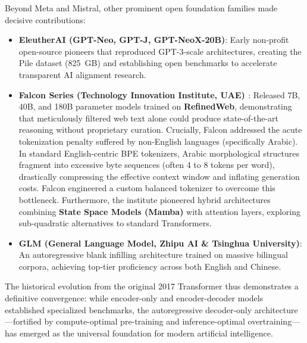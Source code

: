 \documentclass[../../main.tex]{subfiles}
\begin{document}
Beyond Meta and Mistral, other prominent open foundation families made decisive contributions:
\begin{itemize}
    \item \textbf{EleutherAI (GPT-Neo, GPT-J, GPT-NeoX-20B)}: Early non-profit open-source pioneers that reproduced GPT-3-scale architectures, creating the Pile dataset (825~GB) and establishing open benchmarks to accelerate transparent AI alignment research.
    \item \textbf{Falcon Series (Technology Innovation Institute, UAE) \cite{almazrouei2023falcon}}: Released 7B, 40B, and 180B parameter models trained on \textbf{RefinedWeb}, demonstrating that meticulously filtered web text alone could produce state-of-the-art reasoning without proprietary curation. Crucially, Falcon addressed the acute tokenization penalty suffered by non-English languages (specifically Arabic). In standard English-centric BPE tokenizers, Arabic morphological structures fragment into excessive byte sequences (often 4 to 8 tokens per word), drastically compressing the effective context window and inflating generation costs. Falcon engineered a custom balanced tokenizer to overcome this bottleneck. Furthermore, the institute pioneered hybrid architectures combining \textbf{State Space Models (Mamba)} with attention layers, exploring sub-quadratic alternatives to standard Transformers.
    \item \textbf{GLM (General Language Model, Zhipu AI \& Tsinghua University)}: An autoregressive blank infilling architecture trained on massive bilingual corpora, achieving top-tier proficiency across both English and Chinese.
\end{itemize}

The historical evolution from the original 2017 Transformer thus demonstrates a definitive convergence: while encoder-only and encoder-decoder models established specialized benchmarks, the autoregressive decoder-only architecture—fortified by compute-optimal pre-training and inference-optimal overtraining—has emerged as the universal foundation for modern artificial intelligence.

\clearpage\thispagestyle{empty}\null\clearpage
\end{document}
